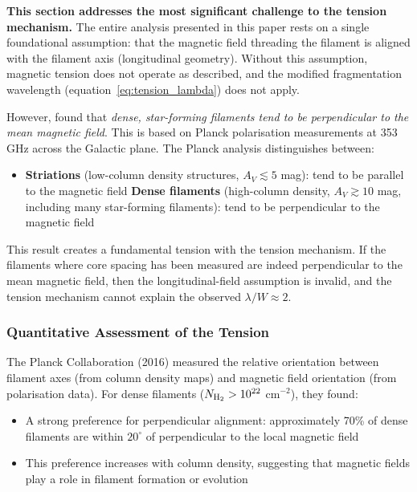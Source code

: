 \documentclass[11pt,a4paper]{article}
\begin{document}
\textbf{This section addresses the most significant challenge to the tension mechanism.} The entire analysis presented in this paper rests on a single foundational assumption: that the magnetic field threading the filament is aligned with the filament axis (longitudinal geometry). Without this assumption, magnetic tension does not operate as described, and the modified fragmentation wavelength (equation~\ref{eq:tension_lambda}) does not apply.

However, \cite{Planck2016} found that \emph{dense, star-forming filaments tend to be perpendicular to the mean magnetic field}. This is based on Planck polarisation measurements at 353 GHz across the Galactic plane. The Planck analysis distinguishes between:
\begin{itemize}
    \item \textbf{Striations} (low-column density structures, $A_V \lesssim 5$ mag): tend to be parallel to the magnetic field
    \textbf{Dense filaments} (high-column density, $A_V \gtrsim 10$ mag, including many star-forming filaments): tend to be perpendicular to the magnetic field
\end{itemize}

This result creates a fundamental tension with the tension mechanism. If the filaments where core spacing has been measured are indeed perpendicular to the mean magnetic field, then the longitudinal-field assumption is invalid, and the tension mechanism cannot explain the observed $\lambda/W \approx 2$.

\subsubsection{Quantitative Assessment of the Tension}

The Planck Collaboration (2016) measured the relative orientation between filament axes (from column density maps) and magnetic field orientation (from polarisation data). For dense filaments ($N_{\rm H_2} > 10^{22}$ cm$^{-2}$), they found:
\begin{itemize}
    \item A strong preference for perpendicular alignment: approximately 70\% of dense filaments are within $20^\circ$ of perpendicular to the local magnetic field
    \item This preference increases with column density, suggesting that magnetic fields play a role in filament formation or evolution
\end{itemize}
\end{document}
